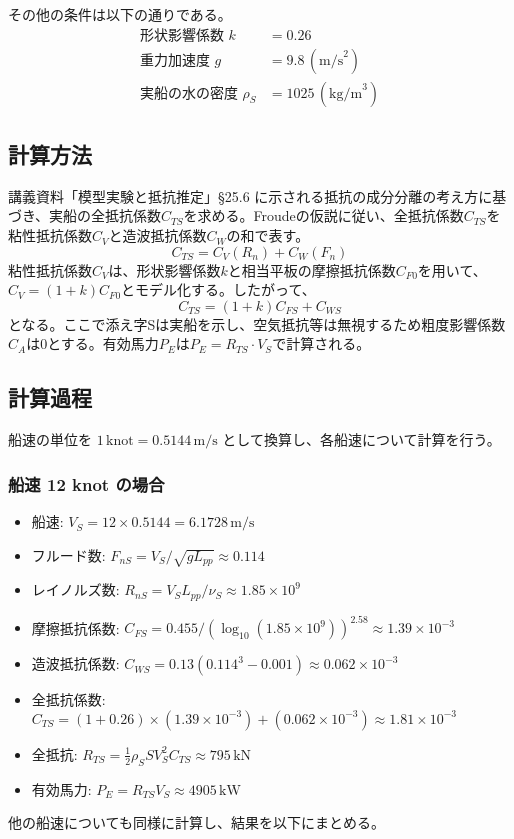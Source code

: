 \documentclass[12pt, a4paper, leqno, dvipdfmx]{jarticle}
\begin{document}
\noindent
その他の条件は以下の通りである。
\begin{align*}
    \text{形状影響係数 } k &= 0.26 \\
    \text{重力加速度 } g &= 9.8 \, (\text{m/s}^2) \\
    \text{実船の水の密度 } \rho_S &= 1025 \, (\text{kg/m}^3) 
\end{align*}

\subsection*{計算方法}
講義資料「模型実験と抵抗推定」§25.6 に示される抵抗の成分分離の考え方に基づき、実船の全抵抗係数$C_{TS}$を求める。Froudeの仮説に従い、全抵抗係数$C_{TS}$を粘性抵抗係数$C_V$と造波抵抗係数$C_W$の和で表す。
$$ C_{TS} = C_V(R_n) + C_W(F_n) $$
粘性抵抗係数$C_V$は、形状影響係数$k$と相当平板の摩擦抵抗係数$C_{F0}$を用いて、$C_V=(1+k)C_{F0}$とモデル化する。したがって、
$$ C_{TS} = (1+k)C_{FS} + C_{WS} $$
となる。ここで添え字Sは実船を示し、空気抵抗等は無視するため粗度影響係数$C_A$は0とする。有効馬力$P_E$は$P_E = R_{TS} \cdot V_S$で計算される。

\subsection*{計算過程}
船速の単位を $1 \, \text{knot} = 0.5144 \, \text{m/s}$ として換算し、各船速について計算を行う。

\subsubsection{船速 12 knot の場合}
\begin{itemize}
    \item 船速: $V_S = 12 \times 0.5144 = 6.1728 \, \text{m/s}$
    \item フルード数: $F_{nS} = V_S / \sqrt{g L_{pp}} \approx 0.114$
    \item レイノルズ数: $R_{nS} = V_S L_{pp} / \nu_S \approx 1.85 \times 10^9$
    \item 摩擦抵抗係数: $C_{FS} = 0.455 / (\log_{10}(1.85 \times 10^9))^{2.58} \approx 1.39 \times 10^{-3}$
    \item 造波抵抗係数: $C_{WS} = 0.13(0.114^3 - 0.001) \approx 0.062 \times 10^{-3}$
    \item 全抵抗係数: $C_{TS} = (1+0.26) \times (1.39 \times 10^{-3}) + (0.062 \times 10^{-3}) \approx 1.81 \times 10^{-3}$
    \item 全抵抗: $R_{TS} = \frac{1}{2} \rho_S S V_S^2 C_{TS} \approx 795 \, \text{kN}$
    \item 有効馬力: $P_E = R_{TS} V_S \approx 4905 \, \text{kW}$
\end{itemize}
他の船速についても同様に計算し、結果を以下にまとめる。
\end{document}
